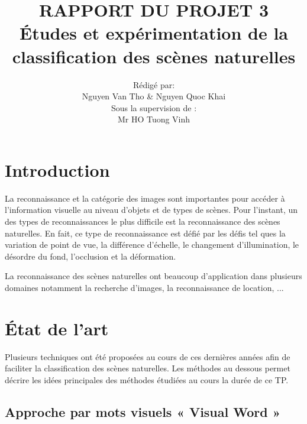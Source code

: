 \documentclass[french,12pt,a4paper,oneside,notitlepage]{report}
\begin{document}
\title{RAPPORT DU PROJET 3\\
  Études et expérimentation de la classification des scènes naturelles}   %
  \author{Rédigé par:\\
      Nguyen Van Tho \& Nguyen Quoc Khai\vspace{1cm}\\
  Sous la supervision de :\\
  Mr HO Tuong Vinh}         


\maketitle

\section{Introduction}
%  
La reconnaissance et la catégorie des images sont importantes pour accéder à l'information visuelle au niveau d'objets et de types de
scènes. Pour l'instant, un des types de reconnaissances le plus difficile est la reconnaissance des scènes naturelles.
En fait, ce type de reconnaissance est défié par les défis tel ques la variation de point 
de vue, la
différence d'échelle, le changement d'illumination, le désordre du fond, l'occlusion
et la déformation. 

La reconnaissance des scènes naturelles ont beaucoup d'application dans plusieurs domaines
notamment la recherche d'images, la reconnaissance de location, ...
\
\section{État de l'art}
Plusieurs techniques ont été proposées au cours de ces dernières années afin de faciliter la classification des scènes naturelles. Les méthodes au dessous permet décrire les idées principales des méthodes étudiées au cours la durée de ce TP.

\pagebreak
\subsection{Approche par mots visuels « Visual Word »}
\end{document}
